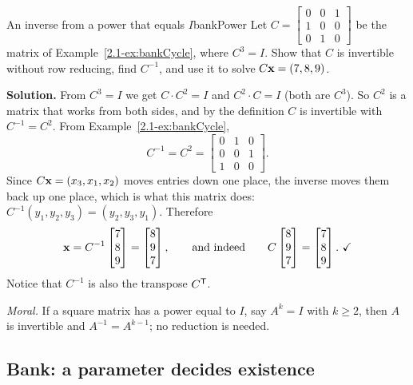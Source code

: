 \documentclass[11pt]{article}
\begin{document}
\begin{exmp}{An inverse from a power that equals $I$}{bankPower}
Let $C=\begin{bmatrix}0&0&1\\1&0&0\\0&1&0\end{bmatrix}$ be the matrix of Example~\ref{2.1-ex:bankCycle}, where $C^3=I$. Show that $C$ is invertible without row reducing, find $C^{-1}$, and use it to solve $C\mathbf{x}=(7,8,9)$.

\textbf{Solution.} From $C^3=I$ we get $C\cdot C^2=I$ and $C^2\cdot C=I$ (both are $C^3$). So $C^2$ is a matrix that works from both sides, and by the definition $C$ is invertible with $C^{-1}=C^2$. From Example~\ref{2.1-ex:bankCycle},
\[
C^{-1}=C^2=\begin{bmatrix}0&1&0\\0&0&1\\1&0&0\end{bmatrix}.
\]
Since $C\mathbf{x}=(x_3,x_1,x_2)$ moves entries down one place, the inverse moves them back up one place, which is what this matrix does: $C^{-1}(y_1,y_2,y_3)=(y_2,y_3,y_1)$. Therefore
\[
\bv{x}=C^{-1}\begin{bmatrix}7\\8\\9\end{bmatrix}=\begin{bmatrix}8\\9\\7\end{bmatrix},\qquad\text{and indeed}\qquad C\begin{bmatrix}8\\9\\7\end{bmatrix}=\begin{bmatrix}7\\8\\9\end{bmatrix}.\ \checkmark
\]
Notice that $C^{-1}$ is also the transpose $C^{\mathsf T}$.

\emph{Moral.} If a square matrix has a power equal to $I$, say $A^k=I$ with $k\ge2$, then $A$ is invertible and $A^{-1}=A^{k-1}$; no reduction is needed.
\end{exmp}

\subsection*{Bank: a parameter decides existence}
\end{document}
